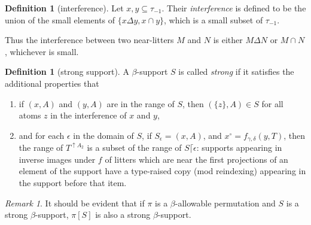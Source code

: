 \documentclass[112pt]{article}
\theoremstyle{definition}
\newtheorem{definition}[theorem]{Definition}
\theoremstyle{remark}
\newtheorem{remark}[theorem]{Remark}
\newcommand{\rk}[1]{{\color{blue}\sl #1}}
\newcommand{\hsuggest}[1]{{\color{magenta}#1}}
\begin{document}
{

\begin{definition}[interference]
Let $x, y \subseteq \tau_{-1}$.
Their {\em interference\/} is defined to be the union of the small elements of $\{ x \Delta y, x \cap y \}$, which is a small subset of $\tau_{-1}$.
\end{definition}
Thus the interference between two near-litters $M$ and $N$ is either $M \Delta N$ or $M \cap N$, whichever is small.
\begin{definition}[strong support]\label{def:strong_support}
A $\beta$-support $S$ is called {\em strong\/} %
if it satisfies the additional properties that

\begin{enumerate}

\item if $(x,A)$ and $(y,A)$ are in the range of $S$, then $(\{z\},A) \in S$ for all atoms $z$ in the interference of $x$ and $y$,

\item and for each $\epsilon$ in the domain of $S$, if $S_\epsilon = (x,A)$, and $x^\circ = f_{\gamma,\delta}(y,T)$, then the range of $T^{\uparrow A_2}$ is a subset of the range of $S \lceil \epsilon$:  supports appearing in inverse images under $f$ of litters which are near the first projections of an element of the support have a type-raised copy (mod reindexing) appearing in the support before that item.
\end{enumerate}
\end{definition}
}

\begin{remark}
It should be evident that if $\pi$ is a $\beta$-allowable permutation and $S$ is a strong $\beta$-support,
$\pi[S]$ is also a strong $\beta$-support.
\end{remark}
\end{document}
